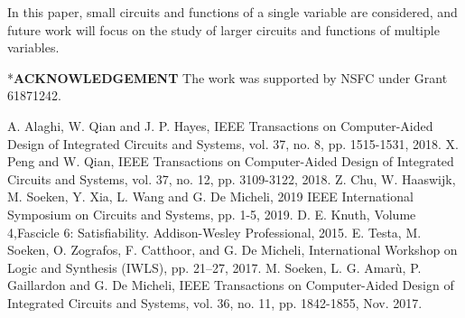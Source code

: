\documentclass[conference,letterpaper]{IEEEtran}
\makeatletter
\renewcommand{\section}{\@startsection{section}{1}{0mm}
    {-\baselineskip}{0.001\baselineskip}{\bf\leftline}}
\makeatother
\begin{document}
In this paper, small circuits and functions of a single variable are considered, and future work will focus on the study of larger circuits and functions of multiple variables.

\section*{\textbf{\large ACKNOWLEDGEMENT}} \vspace{-0ex}
The work was supported by NSFC under Grant 61871242.

\small
\begin{thebibliography}{10}
A. Alaghi, W. Qian and J. P. Hayes, IEEE Transactions on Computer-Aided Design of Integrated Circuits and Systems, vol. 37, no. 8, pp. 1515-1531, 2018.
X. Peng and W. Qian, IEEE Transactions on Computer-Aided Design of Integrated Circuits and Systems, vol. 37, no. 12, pp. 3109-3122, 2018.
Z. Chu, W. Haaswijk, M. Soeken, Y. Xia, L. Wang and G. De Micheli, 2019 IEEE International Symposium on Circuits and Systems, pp. 1-5,  2019.
D. E. Knuth, Volume 4,Fascicle 6: Satisfiability. Addison-Wesley Professional, 2015.
E. Testa, M. Soeken, O. Zografos, F. Catthoor, and G. De Micheli,  International Workshop on Logic and Synthesis (IWLS), pp. 21–27, 2017.
M. Soeken, L. G. Amarù, P. Gaillardon and G. De Micheli, IEEE Transactions on Computer-Aided Design of Integrated Circuits and Systems, vol. 36, no. 11, pp. 1842-1855, Nov. 2017.
\end{thebibliography}

%
\end{document}
